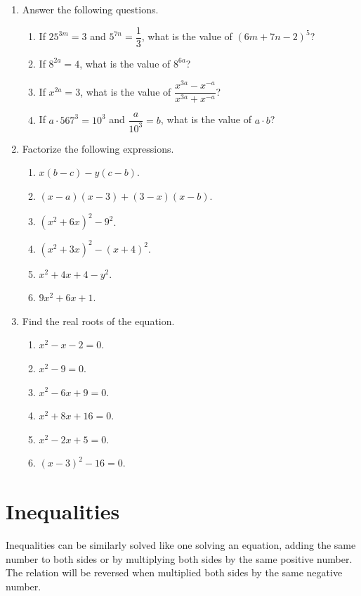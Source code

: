 \documentclass[11pt]{book}
\theoremstyle{break}
\theoremstyle{no_label}
\numberwithin{equation}{section}
\begin{document}
\begin{enumerate}[label=\arabic*.]
    \item Answer the following questions.
    \begin{enumerate}
        \item If $25^{3m}=3$ and $5^{7n}=\dfrac{1}{3}$, what is the value of $(6m+7n-2)^5$?
        \item If $8^{2a}=4$, what is the value of $8^{6a}$?
        \item If $x^{2a}=3$, what is the value of $\dfrac{x^{3a}-x^{-a}}{x^{3a}+x^{-a}}$?
        \item If $a\cdot567^3=10^3$ and $\dfrac{a}{10^3}=b$, what is the value of $a\cdot b$?
    \end{enumerate}
    \item Factorize the following expressions.
    \begin{multicols}{2}
        \begin{enumerate}
            \item $x(b-c)-y(c-b)$.
            \item $(x-a)(x-3)+(3-x)(x-b)$.
            \item $(x^2+6x)^2-9^2$.
            \item $(x^2+3x)^2-(x+4)^2$.
            \item $x^2+4x+4-y^2$.
            \item $9x^2+6x+1$.
        \end{enumerate}
    \end{multicols}
    \item Find the real roots of the equation.
    \begin{multicols}{2}
        \begin{enumerate}
            \item $x^2-x-2=0$.
            \item $x^2-9=0$.
            \item $x^2-6x+9=0$.
            \item $x^2+8x+16=0$.
            \item $x^2-2x+5=0$.
            \item $(x-3)^2-16=0$.
        \end{enumerate}
    \end{multicols}
\end{enumerate}

\section{Inequalities}

Inequalities can be similarly solved like one solving an equation, adding the same number to both sides or by multiplying both sides by the same positive number. The relation will be reversed when multiplied both sides by the same negative number.
\end{document}
